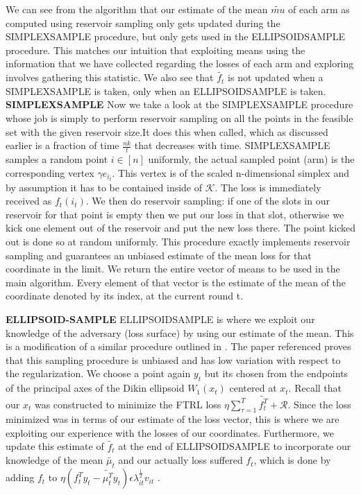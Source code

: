 
We can see from the algorithm that our estimate of the mean $\tilde{mu}$ of each arm as computed 
using reservoir sampling only gets updated during the SIMPLEXSAMPLE procedure, but only gets 
used in the ELLIPSOIDSAMPLE procedure. This matches our intuition that exploiting means using the
information that we have collected regarding the losses of each arm and exploring involves gathering this statistic. We also see that $\tilde{f_t}$ is not updated when a SIMPLEXSAMPLE is taken,
only when an ELLIPSOIDSAMPLE is taken. \\


\textbf{SIMPLEXSAMPLE}
Now we take a look at the SIMPLEXSAMPLE procedure whose job is simply to perform reservoir sampling on all the points in the feasible set with the given reservoir size.It does this when called, which as discussed earlier is a fraction of time $\frac{nk}{t}$ that decreases with time.
SIMPLEXSAMPLE samples a random point $i \in [n]$ uniformly, the actual sampled point (arm) 
is the corresponding vertex $\gamma e_{i_t}$. This vertex is of the scaled n-dimensional simplex
and by assumption it has to be contained inside of $\mathcal{K}$. The loss is immediately received as $f_t(i_t)$. We then do reservoir sampling: if one of the slots in our reservoir for that
point is empty then we put our loss in that slot, otherwise we kick one element out of the reservoir and put the new loss there. The point kicked out is done so at random uniformly. This procedure exactly implements reservoir sampling and guarantees an unbiased estimate of the mean loss
for that coordinate in the limit. We return the entire vector of means to be used in the main algorithm. Every element of that vector is the estimate of the mean of the coordinate denoted by its
index, at the current round t.
 
\textbf{ELLIPSOID-SAMPLE}
ELLIPSOIDSAMPLE is where we exploit our knowledge of the adversary (loss surface) by using
our estimate of the mean. This is a modification of a similar procedure outlined in \citep{abernethy}. The paper referenced proves that this sampling procedure is unbiased and has low variation with respect to the regularization. We choose a point again $y_t$ but its chosen from the endpoints of the principal axes of the Dikin ellipsoid $W_1(x_t)$ centered at $x_t$. Recall that our $x_t$ was constructed to minimize the FTRL loss $\eta \sum_{\tau=1}^T\tilde{f_t^T} +\mathcal{R}$.
Since the loss minimized was in terms of our estimate of the loss vector, this is where we are
exploiting our experience with the losses of our coordinates. Furthermore, we update this estimate of $\tilde{f_t}$ at the end of ELLIPSOIDSAMPLE to incorporate our knowledge of the mean $\tilde{\mu_t}$ and our actually loss suffered $f_t$, which is done by adding $f_t$ to 
$\eta (f_{t}^Ty_t - \tilde{\mu_{t}^T}y_t)\epsilon \lambda_{it}^{\frac{1}{2}}v_{it}$ .\\

